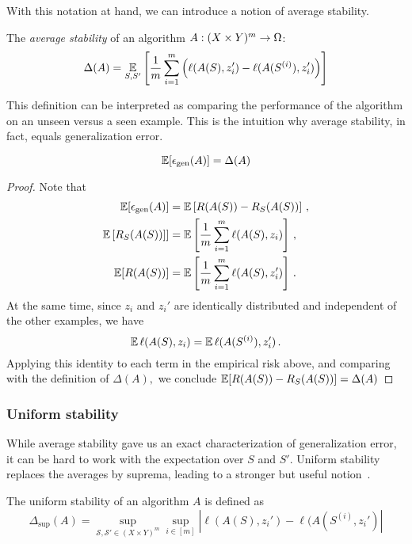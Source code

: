 With this notation at hand, we can introduce a notion of average stability.
\begin{definition} 
The \emph{average stability} of an algorithm $A: (X \times Y)^{m} \rightarrow \Omega$:
$$\Delta(A) = \operatorname*{\mathbb{E}}_{S,
S^{\prime}}\left[\frac{1}{m}\sum_{i=1}^{m}\left(\ell(A(S),z_i^{\prime}) -
\ell(A(S^{(i)}),z_{i}^{\prime})\right)\right]$$
\end{definition}
This definition can be interpreted as comparing the performance of the algorithm 
on an unseen versus a seen example. This is the intuition why average stability,
in fact, equals generalization error.
\begin{theorem}
$$\operatorname*{\mathbb{E}}[\epsilon_{\text{gen}}(A)] = \Delta(A)$$
\end{theorem}
\begin{proof}
Note that
\begin{align*}
\operatorname*{\mathbb{E}}[\epsilon_{\text{gen}}(A)] &= \operatorname*{\mathbb{E}}\left[R(A(S)) - R_{S}(A(S))\right]\,, \\
\operatorname*{\mathbb{E}}\left[R_{S}(A(S))\right]] &=
\operatorname*{\mathbb{E}}\left[\frac{1}{m}\sum_{i=1}^{m}\ell(A(S),z_i)\right]\,,\\
\operatorname*{\mathbb{E}} [R(A(S))]&=
\operatorname*{\mathbb{E}}\left[\frac{1}{m}\sum_{i=1}^{m}\ell(A(S),z_i^{\prime})\right]\,.
\end{align*}
At the same time, since $z_i$ and $z_i'$ are identically distributed and
independent of the other examples, we have
\[
\operatorname*{\mathbb{E}}\ell(A(S),z_i) = \operatorname*{\mathbb{E}}\ell(A(S^{(i)}),z_i^{\prime})\,.
\]
Applying this identity to each term in the empirical risk above, and comparing
with the definition of $\Delta(A),$ we conclude
$\operatorname*{\mathbb{E}}[R(A(S)) - R_S(A(S))] = \Delta(A)$
\end{proof}

\subsubsection{Uniform stability}
%
While average stability gave us an exact characterization of generalization
error, it can be hard to work with the expectation over $S$ and $S'.$ Uniform
stability replaces the averages by suprema, leading to a stronger but useful
notion~\cite{BousquettE02}.
%
\begin{definition}
The uniform stability of an algorithm $A$ is defined as 
\begin{equation*}
\Delta_{\sup}(A) = \sup_{\mathcal{S}, \mathcal{S}' \in (X\times Y)^m } 
\sup_{i \in [m]} |\ell(A(S), z_i') - \ell(A(S^{(i)}, z_i')|
\end{equation*}
\end{definition}

